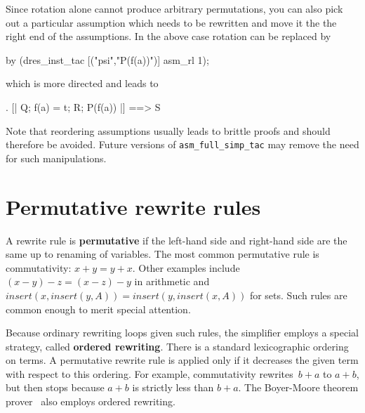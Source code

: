 Since rotation alone cannot produce arbitrary permutations, you can also pick
out a particular assumption which needs to be rewritten and move it the the
right end of the assumptions.  In the above case rotation can be replaced by
\begin{ttbox}
by (dres_inst_tac [("psi","P(f(a))")] asm_rl 1);
\end{ttbox}
which is more directed and leads to
\begin{ttbox}
{. [| Q; f(a) = t; R; P(f(a)) |] ==> S}
\end{ttbox}

Note that reordering assumptions usually leads to brittle proofs and should
therefore be avoided.  Future versions of \verb$asm_full_simp_tac$ may remove
the need for such manipulations.

\section{Permutative rewrite rules}

A rewrite rule is {\bf permutative} if the left-hand side and right-hand
side are the same up to renaming of variables.  The most common permutative
rule is commutativity: $x+y = y+x$.  Other examples include $(x-y)-z =
(x-z)-y$ in arithmetic and $insert(x,insert(y,A)) = insert(y,insert(x,A))$
for sets.  Such rules are common enough to merit special attention.

Because ordinary rewriting loops given such rules, the simplifier employs a
special strategy, called {\bf ordered rewriting}.
There is a standard lexicographic ordering on terms.  A permutative rewrite
rule is applied only if it decreases the given term with respect to this
ordering.  For example, commutativity rewrites~$b+a$ to $a+b$, but then
stops because $a+b$ is strictly less than $b+a$.  The Boyer-Moore theorem
prover~\cite{bm88book} also employs ordered rewriting.

